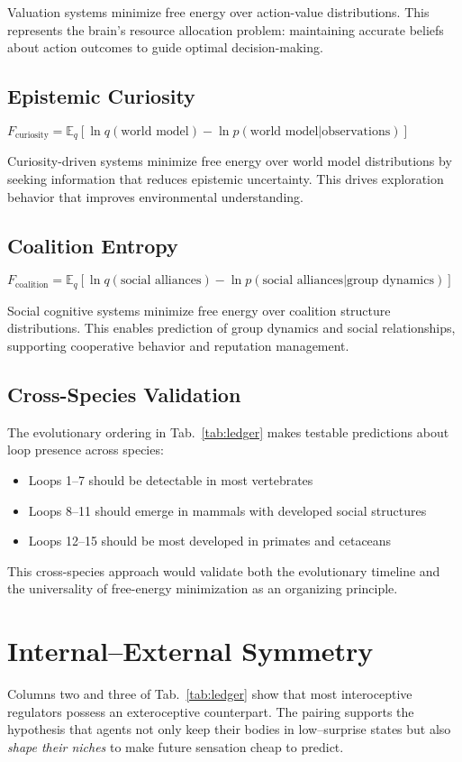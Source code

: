 \documentclass[10pt]{article}
\begin{document}
Valuation systems minimize free energy over action-value distributions. This represents the brain's resource allocation problem: maintaining accurate beliefs about action outcomes to guide optimal decision-making.

\subsection{Epistemic Curiosity}
$F_{\text{curiosity}} = \mathbb{E}_q[\ln q(\text{world model}) - \ln p(\text{world model}|\text{observations})]$

Curiosity-driven systems minimize free energy over world model distributions by seeking information that reduces epistemic uncertainty. This drives exploration behavior that improves environmental understanding.

\subsection{Coalition Entropy}
$F_{\text{coalition}} = \mathbb{E}_q[\ln q(\text{social alliances}) - \ln p(\text{social alliances}|\text{group dynamics})]$

Social cognitive systems minimize free energy over coalition structure distributions. This enables prediction of group dynamics and social relationships, supporting cooperative behavior and reputation management.

\subsection{Cross-Species Validation}
The evolutionary ordering in Tab.~\ref{tab:ledger} makes testable predictions about loop presence across species:
\begin{itemize}
\item Loops 1--7 should be detectable in most vertebrates
\item Loops 8--11 should emerge in mammals with developed social structures  
\item Loops 12--15 should be most developed in primates and cetaceans
\end{itemize}

This cross-species approach would validate both the evolutionary timeline and the universality of free-energy minimization as an organizing principle.

\section{Internal--External Symmetry}
Columns two and three of Tab.~\ref{tab:ledger} show that most interoceptive regulators possess an exteroceptive counterpart.  
The pairing supports the hypothesis that agents not only keep their bodies in low--surprise states 
but also \emph{shape their niches} to make future sensation cheap to predict.
\end{document}
